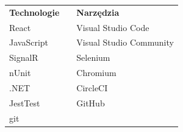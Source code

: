 \documentclass[12pt]{report}
\begin{document}
	\begin{center}
		\begin{table}[h]
			\def\arraystretch{1.3}
			\begin{tabular}{lll}
				
				\textbf{Technologie} & \hspace{20mm} & \textbf{Narzędzia}      \\
				React                &  & Visual Studio Code      \\
				JavaScript           &  & Visual Studio Community \\
				SignalR              &  & Selenium                \\
				nUnit                &  & Chromium                \\
				.NET                 &  & CircleCI                \\
				JestTest             &  & GitHub                  \\
				git                  &  &                        
			\end{tabular}
		\end{table}
\end{center}
	
	
\end{document}
